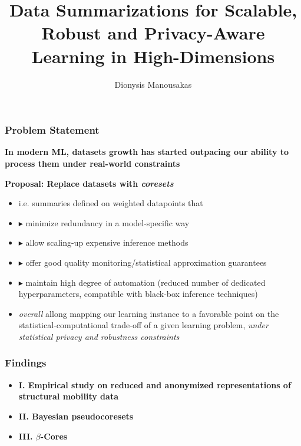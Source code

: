 \documentclass[hyperref={colorlinks = true},unknownkeysallowed]{beamer}
\title{Data Summarizations for Scalable, Robust and Privacy-Aware Learning in High-Dimensions}
\author{Dionysis Manousakas}
\institute{Department of Computer Science \& Technology, \\University of Cambridge}
\date{}
\begin{document}
	
\begin{frame}
\vspace{2cm}
  \titlepage
  \vspace{10cm}
\end{frame}

\begin{frame}
	\frametitle{Problem Statement}
	\begin{tcolorbox}[colback=green!5,colframe=white!40!black]  
		\centering
		\textbf{In modern ML, datasets growth has started outpacing our ability to process them under real-world constraints}\\
	\end{tcolorbox}
	\textbf{Proposal: Replace datasets with \emph{coresets}}
	\begin{itemize}
		\item i.e. summaries defined on weighted datapoints that
		\pause
		\item $\blacktriangleright$ minimize redundancy in a model-specific way
		\pause
		\item $\blacktriangleright$ allow scaling-up expensive inference methods
		\pause
		\item $\blacktriangleright$ offer good quality monitoring/statistical approximation guarantees
		\pause 
		\item  $\blacktriangleright$ maintain high degree of automation (reduced number of dedicated hyperparameters, compatible with black-box inference techniques)
		\pause
		\item \emph{overall} allong mapping our learning instance to a favorable point on the statistical-computational trade-off  of a given learning problem, \emph{under statistical privacy and robustness constraints}
	\end{itemize}
\end{frame}

\begin{frame}
	\frametitle{Findings}
	\begin{itemize}
		\item \textbf{I. Empirical study on reduced and anonymized representations of structural mobility data} 
		\item \textbf{II. Bayesian pseudocoresets}
		\item \textbf{III. $\beta$-Cores}
	\end{itemize}
\end{frame}
\end{document}
